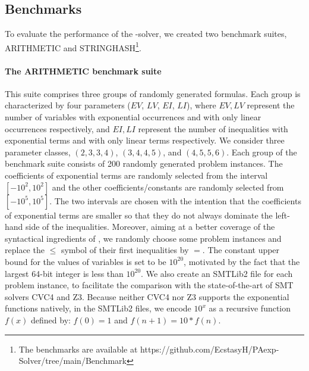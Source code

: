 \vspace*{-4mm}
\subsection{Benchmarks}

To evaluate the performance of the {\paexp}-solver, we created two benchmark suites, ARITHMETIC and STRINGHASH\footnote{The benchmarks are available at https://github.com/EcstasyH/PAexp-Solver/tree/main/Benchmark}.

\paragraph{The ARITHMETIC benchmark suite} 
This suite comprises three groups of randomly generated {\paexp} formulas. Each group is characterized by four parameters ($EV$, $LV$, $EI$, $LI$), where $EV, LV$ represent the number of variables with exponential occurrences and with only linear occurrences respectively, and $EI, LI$ represent the number of inequalities with exponential terms and with only linear terms respectively. 
We consider three parameter classes, $(2, 3, 3, 4)$, $(3, 4, 4, 5)$, and $(4, 5, 5, 6)$. 
Each group of the benchmark suite consists of 200 randomly generated problem instances. The coefficients of exponential terms are randomly selected from the interval $[-10^2, 10^2]$ and the other coefficients/constants are randomly selected from $[-10^5, 10^5]$. The two intervals are chosen with the intention that the coefficients of exponential terms are smaller so that they do not always dominate the left-hand side of the inequalities. Moreover, aiming at a better coverage of the syntactical ingredients of {\paexp}, we randomly choose some problem instances and replace the $\le$ symbol of their first inequalities by $=$. The constant upper bound for the values of variables is set to be $10^{20}$, motivated by the fact that the largest 64-bit integer is less than $10^{20}$. We also create an SMTLib2 file for each problem instance, to facilitate the comparison with the state-of-the-art of SMT solvers CVC4 and Z3. Because neither CVC4 nor Z3 supports the exponential functions natively, in the SMTLib2 files, we encode $10^x$ as a recursive function $f(x)$ defined by: $f(0) = 1$ and $f(n+1) = 10*f(n)$.

%

